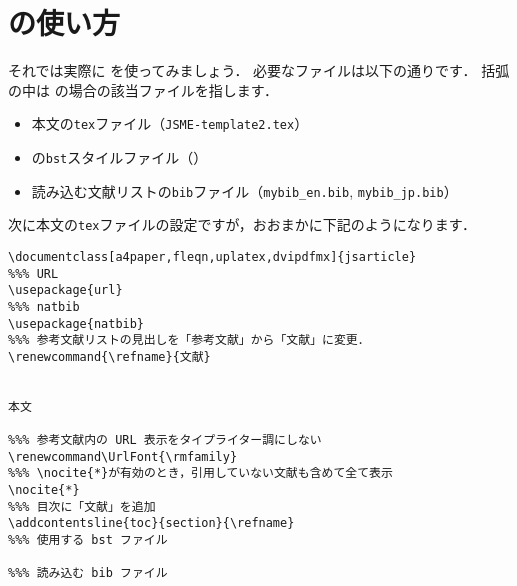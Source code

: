 \clearpage
\section{\jsmefile の使い方}
\label{sec:howtouse}
それでは実際に \jsmefile を使ってみましょう．
必要なファイルは以下の通りです．
括弧の中は \JSMErepos の場合の該当ファイルを指します．
\begin{itemize}
    \item 本文の\verb|tex|ファイル（\verb|JSME-template2.tex|）
    \item \BibTeX の\verb|bst|スタイルファイル（\jsmefile）
    \item 読み込む文献リストの\verb|bib|ファイル（\verb|mybib_en.bib|, \verb|mybib_jp.bib|）
\end{itemize}
次に本文の\verb|tex|ファイルの設定ですが，おおまかに下記のようになります．
\begin{tcolorbox}[enhanced, title=\textgt{本文の\texttt{tex}ファイルに必要な設定}, drop fuzzy shadow]
\begin{verbatim}
\documentclass[a4paper,fleqn,uplatex,dvipdfmx]{jsarticle}
%%% URL
\usepackage{url}
%%% natbib
\usepackage{natbib}
%%% 参考文献リストの見出しを「参考文献」から「文献」に変更．
\renewcommand{\refname}{文献}


本文

%%% 参考文献内の URL 表示をタイプライター調にしない
\renewcommand\UrlFont{\rmfamily}
%%% \nocite{*}が有効のとき，引用していない文献も含めて全て表示
\nocite{*}
%%% 目次に「文献」を追加
\addcontentsline{toc}{section}{\refname}
%%% 使用する bst ファイル

%%% 読み込む bib ファイル


\end{verbatim}
\end{tcolorbox}

